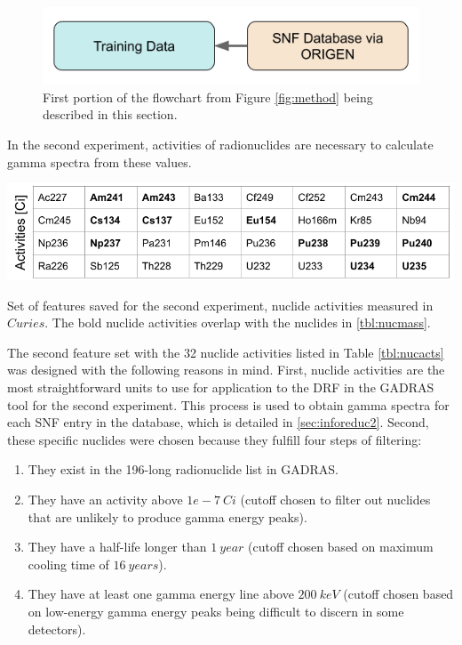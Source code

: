 \begin{figure}[H]
  \centering
  \includegraphics[width=0.7\linewidth]{./chapters/exp1/methodology1.png}
  \caption{First portion of the flowchart from Figure \ref{fig:method} being 
           described in this section.}
\end{figure}


In the second experiment, activities of radionuclides are necessary to
calculate gamma spectra from these values.

\begin{table}[!htb]
  \centering
  \includegraphics[width=\linewidth]{./chapters/exp2/nucacts_feats.png}
  \caption{Set of features saved for the second experiment, nuclide activities
           measured in $Curies$. The bold nuclide activities overlap with the 
           nuclides in \ref{tbl:nucmass}.}
  \label{tbl:nucacts}
\end{table}

The second feature set with the 32 nuclide activities listed in Table
\ref{tbl:nucacts} was designed with the following reasons in mind. First,
nuclide activities are the most straightforward units to use for application to
the \gls{DRF} in the \gls{GADRAS} tool for the second experiment. This process
is used to obtain gamma spectra for each \gls{SNF} entry in the database, which
is detailed in \ref{sec:inforeduc2}.  Second, these specific nuclides were
chosen because they fulfill four steps of filtering:
\begin{enumerate}
  \item They exist in the 196-long radionuclide list in \gls{GADRAS}.
  \item They have an activity above $1e-7\:Ci$ (cutoff chosen to filter out
  nuclides that are unlikely to produce gamma energy peaks).
  \item They have a half-life longer than $1\:year$ (cutoff chosen based on
  maximum cooling time of $16\:years$).
  \item They have at least one gamma energy line above $200\:keV$ (cutoff
  chosen based on low-energy gamma energy peaks being difficult to discern in
  some detectors).
\end{enumerate}

